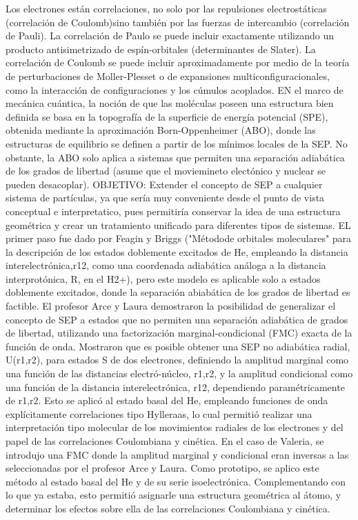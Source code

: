 \documentclass{article}
\begin{document}
Los electrones están correlaciones, no solo por las repulsiones electrostáticas
(correlación de Coulomb)sino también por las fuerzas de intercambio (correlación de
Pauli). La correlación de Paulo se puede incluir exactamente utilizando
un producto antisimetrizado de espín-orbitales (determinantes de Slater). La
correlación de Coulomb se puede incluir aproximadamente por medio de la teoría de 
perturbaciones de Moller-Plesset o de expansiones multiconfiguracionales, como 
la interacción de configuraciones y los cúmulos acoplados. 
EN el marco de mecánica cuántica, la noción de que las moléculas poseen una 
estructura bien definida se basa en la topografía de la superficie de energía
potencial (SPE), obtenida mediante la aproximación Born-Oppenheimer (ABO), donde
las estructuras de equilibrio se definen a partir de los mínimos locales de la SEP.
No obstante, la ABO solo aplica a sistemas que permiten una separación adiabática 
de los grados de libertad (asume que el moviemineto electónico y nuclear se pueden
desacoplar).
OBJETIVO: Extender el concepto de SEP a cualquier sistema de partículas, ya que sería
muy conveniente desde el punto de vista conceptual e interpretatico, pues permitiría 
conservar la idea de una estructura geométrica y crear un tratamiento unificado para 
diferentes tipos de sistemas. 
EL primer paso fue dado por Feagin y Briggs ("Métodode orbitales moleculares" para la 
descripción de los estados doblemente excitados de He, empleando la distancia 
interelectrónica,r12, como una coordenada adiabática análoga a la distancia 
interprotónica, R, en el H2+), pero este modelo es aplicable solo a 
estados doblemente excitados, donde la separación abiabática de los grados de libertad
es factible. 
El profesor Arce y Laura demostraron la posibilidad de generalizar el concepto de SEP a 
estados que no permiten una separación adiabática de grados de libertad, utilizando una
factorización marginal-condicional (FMC) exacta de la función de onda. Mostraron que es 
posible obtener una SEP no adiabática radial, U(r1,r2), para estados S de dos electrones, 
definiendo la amplitud marginal como una función de las distancias electró-núcleo, r1,r2,
y la amplitud condicional como una función de la distancia interelectrónica, r12, dependiendo 
paramétricamente de r1,r2. Esto se aplicó al estado basal del He, empleando funciones de 
onda explícitamente correlaciones tipo Hylleraas, lo cual permitió realizar una interpretación
tipo molecular de los movimientos radiales de los electrones y del papel de las correlaciones
Coulombiana y cinética. 
En el caso de Valeria, se introdujo una FMC donde la amplitud marginal y condicional eran 
inversas a las seleccionadas por el profesor Arce y Laura. Como prototipo, se aplico este método
al estado basal del He y de su serie isoelectrónica. Complementando con lo que ya estaba, esto 
permitió asignarle una estructura geométrica al átomo, y determinar los efectos sobre ella 
de las correlaciones Coulombiana y cinética. 
\begin{center}

\end{center}
\end{document}
